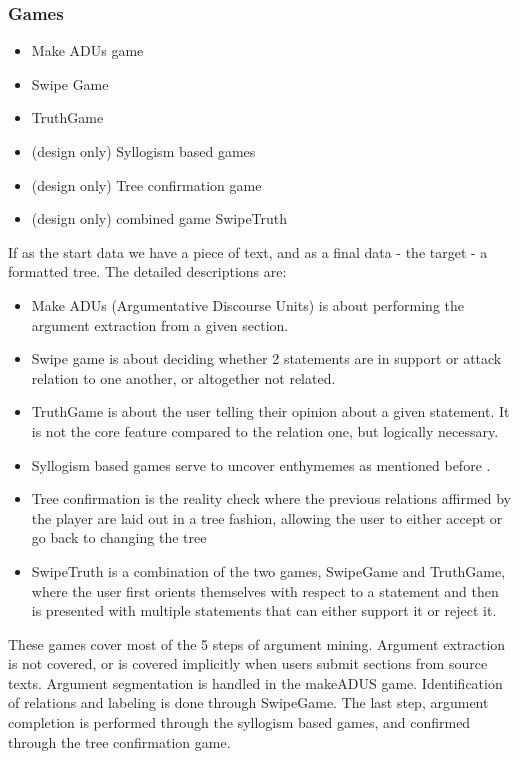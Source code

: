 \documentclass{report}
\begin{document}
\subsubsection{Games}
\begin{itemize}
  \item Make ADUs game
  \item Swipe Game
  \item TruthGame 
  \item (design only) Syllogism based games
  \item (design only) Tree confirmation game
  \item (design only) combined game SwipeTruth
\end{itemize}
If as the start data we have a piece of text, and as a final data - the target - a formatted tree.
The detailed descriptions are:
\begin{itemize}
  \item Make ADUs (Argumentative Discourse Units) is about performing the argument extraction from a given section.
  \item Swipe game is about deciding whether 2 statements are in support or attack relation to one another, or altogether not related.
  \item TruthGame is about the user telling their opinion about a given statement. It is not the core feature compared to the relation one, but logically necessary.
  \item Syllogism based games serve to uncover enthymemes as mentioned before \cite{noauthor_finding_nodate}. 
  \item Tree confirmation is the reality check where the previous relations affirmed by the player are laid out in a tree fashion, allowing the user to either accept or go back to changing the tree
  \item SwipeTruth is a combination of the two games, SwipeGame and TruthGame, where the user first orients themselves with respect to a statement and then is presented with multiple statements that can either support it or reject it.
\end{itemize}

These games cover most of the 5 steps of argument mining. 
Argument extraction is not covered, or is covered implicitly when users submit sections from source texts. Argument segmentation is handled in the makeADUS game. Identification of relations and labeling is done through SwipeGame. The last step, argument completion is performed through the syllogism based games, and confirmed through the tree confirmation game.
\end{document}
